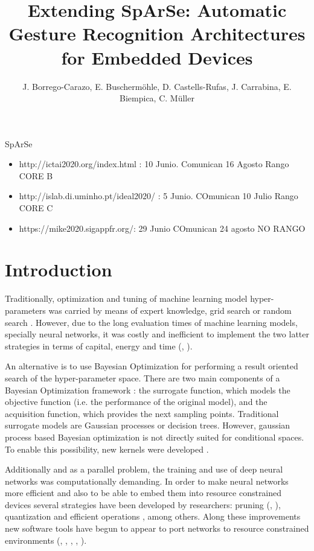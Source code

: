 \documentclass[10pt, a4paper, twocolumn]{article}
\title{Extending SpArSe: Automatic Gesture Recognition Architectures for Embedded Devices}
\author{J. Borrego-Carazo, E. Buscherm\"ohle, D. Castells-Rufas, J. Carrabina, E. Biempica, C. M\"uller}
\date{}
\begin{document}
\maketitle
\abstract
SpArSe
\begin{itemize}
	\item http://ictai2020.org/index.html : 10 Junio. Comunican 16 Agosto Rango CORE B
	\item http://islab.di.uminho.pt/ideal2020/ : 5 Junio. COmunican 10 Julio Rango CORE C
	\item https://mike2020.sigappfr.org/: 29 Junio COmunican 24 agosto NO RANGO
\end{itemize}
\section{Introduction}

Traditionally, optimization and tuning of machine learning model hyper-parameters was carried by means of expert knowledge, grid search or random search \cite{Bergstra2012}. However, due to the long evaluation times of machine learning models, specially neural networks, it was costly and inefficient to implement the two latter strategies in terms of capital, energy and time (\cite{Zoph2016}, \cite{Zoph2018}).

An alternative is to use Bayesian Optimization \cite{Mockus1978} for performing a result oriented search of the hyper-parameter space. There are two main components of a Bayesian Optimization framework \cite{Frazier2018}: the surrogate function, which models the objective function (i.e. the performance of the original model), and the acquisition function, which provides the next sampling points. Traditional surrogate models are Gaussian processes or decision trees. However, gaussian process based Bayesian optimization is not directly suited for conditional spaces. To enable this possibility, new kernels were developed \cite{Swersky2014}.

Additionally and as a parallel problem, the training and use of deep neural networks was computationally demanding. In order to make neural networks more efficient and also to be able to embed them into resource constrained devices several strategies have been developed by researchers: pruning (\cite{Han2015}, \cite{Cun:1990:OBD:109230.109298}), quantization \cite{Jacob2017} and efficient operations \cite{Howard2017}, among others. Along these improvements new software tools have begun to appear to port networks to resource constrained environments (\cite{TFLite}, \cite{Rotem2018}, \cite{ARMNN}, \cite{TensorRT}, \cite{uTensor}).
\end{document}
